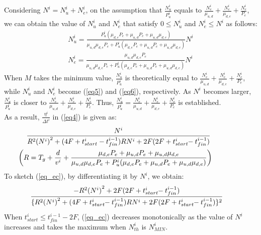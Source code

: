 \documentclass{ieeeaccess}
\begin{document}
%
Considering $N^i=N_u^i + N_e^i$, on the assumption that $\frac{N_u^i}{P_u^i}$ equals to $\frac{N_e^i}{\mu_{u,d}}+\frac{N_e^i}{\mu_{d,e}}+\frac{N_e^i}{P_e}$, we can obtain the value of $N_u^i$ and $N_e^i$ that satisfy $0\leq{N_u^i}$ and ${N_e^i}\leq{N^i}$ as follows:
%
\begin{align}
N_u^i=\frac{P_u^i(\mu_{d,e}P_e+\mu_{u,d}P_e+\mu_{u,d}\mu_{d,e})}{\mu_{u,d}\mu_{d,e}P_e+P_u^i(\mu_{d,e}P_e+\mu_{u,d}P_e+\mu_{u,d}\mu_{d,e})}N^i\label{eq5}\\
N_e^i=\frac{\mu_{u,d}\mu_{d,e}P_e}{\mu_{u,d}\mu_{d,e}P_e+P_u^i(\mu_{d,e}P_e+\mu_{u,d}P_e+\mu_{u,d}\mu_{d,e})}N^i\label{eq6}
\end{align}
%
When $M$ takes the minimum value, $\frac{N_u^i}{P_u^i}$ is theoretically equal to $\frac{N_e^i}{\mu_{u,d}}+\frac{N_e^i}{\mu_{d,e}}+\frac{N_e^i}{P_e}$, while $N_u^i$ and $N_e^i$ become (\ref{eq5}) and (\ref{eq6}), respectively.
%
As $N^i$ becomes larger, $\frac{N_u^i}{P_u^i}$ is closer to $\frac{N_e^i}{\mu_{u,d}}+\frac{N_e^i}{\mu_{d,e}}+\frac{N_e^i}{P_e}$.
%
Thus, $\frac{N_u^i}{P_u^i}=\frac{N_e^i}{\mu_{u,d}}+\frac{N_e^i}{\mu_{d,e}}+\frac{N_e^i}{P_e}$ is established.\\
%
As a result, $\frac{\eta^{i}}{{\Delta{t}}^i}$ in (\ref{eq4}) is given as:
%
\begin{align}
&\hspace{-0.2cm}\frac{N^i}{R^2{(N^i)}^2+(4F+t_{start}^i-t_{fin}^{i-1})R{N^i}+2F(2F+t_{start}^i\hspace{-1mm}-t_{fin}^{i-1})}\hspace{1cm}\label{eq_ec}\\
&\hspace{-0.6cm}\biggl(R=T_g+\frac{d}{v^i}+\frac{\mu_{d,e}P_e+\mu_{u,d}P_e+\mu_{u,d}\mu_{d,e}}{\mu_{u,d}\mu_{d,e}P_e+P_u^i(\mu_{d,e}P_e+\mu_{u,d}P_e+\mu_{u,d}\mu_{d,e})}\biggr)\nonumber
\end{align}
%
To sketch (\ref{eq_ec}), by differentiating it by $N^i$, we obtain:
%
\begin{align}
\hspace{-4mm} \frac{-{R^2{(N^i)}^2}+2F(2F+t_{start}^i\hspace{-1mm}-t_{fin}^{i-1})}{\{R^2{(N^i)}^2+(4F+t_{start}^i\hspace{-1mm}-t_{fin}^{i-1})R{N^i}+2F(2F+t_{start}^i\hspace{-1mm}-t_{fin}^{i-1})\}^2}
\end{align}
%
When $t_{start}^i \leq{t_{fin}^{i-1}-2F}$, (\ref{eq_ec}) decreases monotonically as the value of $N^i$ increases and takes the maximum when $N_{th}^i$ is $N_{MIN}^i$.
\end{document}
